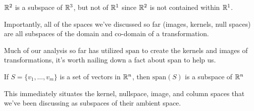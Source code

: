\documentclass{ximera}
\begin{document}
\begin{example}
  
  $\mathbb{R}^2$ is a subspace of $\mathbb{R}^3$, but not of $\mathbb{R}^1$ since $\mathbb{R}^2$ is not contained within $\mathbb{R}^1$. 

\end{example}

Importantly, all of the spaces we've discussed so far (images, kernels, null spaces) are all subspaces of the domain and co-domain of a transformation. 

Much of our analysis so far has utilized $\mbox{span}$ to create the kernels and images of transformations, it's worth nailing down a fact about span to help us.

\begin{theorem}

  If $S=\lbrace v_1, \ldots, v_m\rbrace$ is a set of vectors in $\mathbb{R}^n$, then $\mbox{span}(S)$ is a subspace of $\mathbb{R}^n$

\end{theorem}

This immediately situates the kernel, nullspace, image, and column spaces that we've been discussing as subspaces of their ambient space. 
\end{document}
